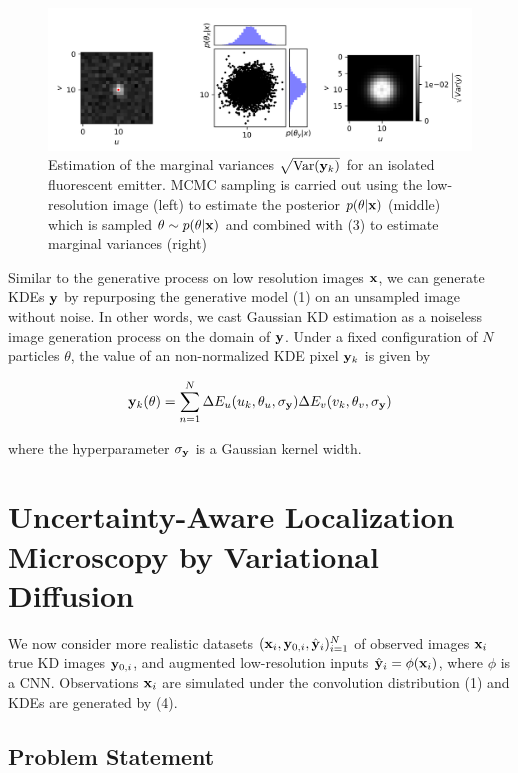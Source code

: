\documentclass{article}
\begin{document}
\begin{figure}
\includegraphics[scale=0.7]{media/MCMC.png}
\caption{Estimation of the marginal variances $\sqrt{\mathrm{Var}(\bold{y}_k)}$ for an isolated fluorescent emitter. MCMC sampling is carried out using the low-resolution image (left) to estimate the posterior $p(\theta|\bold{x})$ (middle) which is sampled $\theta\sim p(\theta|\bold{x})$ and combined with (3) to estimate marginal variances (right)}
\end{figure}

Similar to the generative process on low resolution images $\bold{x}$, we can generate KDEs $\bold{y}$ by repurposing the generative model (1) on an unsampled image without noise. In other words, we cast Gaussian KD estimation as a noiseless image generation process on the domain of $\bold{y}$. Under a fixed configuration of $N$ particles $\theta$, the value of an non-normalized KDE pixel $\bold{y}_{k}$ is given by

\begin{equation}
\bold{y}_{k}(\theta) = \sum_{n=1}^{N}\Delta E_{u}(u_{k},\theta_{u},\sigma_{\bold{y}}) \Delta E_{v}(v_{k},\theta_{v},\sigma_{\bold{y}})
\end{equation}

where the hyperparameter $\sigma_{\bold{y}}$ is a Gaussian kernel width. 

\section{Uncertainty-Aware Localization Microscopy by Variational Diffusion}

We now consider more realistic datasets $(\bold{x}_i,\bold{y}_{0,i},\hat{\bold{y}}_{i})_{i=1}^{N}$ of observed images $\bold{x}_i$ true KD images $\bold{y}_{0,i}$, and augmented low-resolution inputs $\hat{\bold{y}}_{i}=\phi(\bold{x}_{i})$, where $\phi$ is a CNN. Observations $\bold{x}_i$ are simulated under the convolution distribution (1) and KDEs are generated by (4).

\subsection{Problem Statement}
\end{document}
